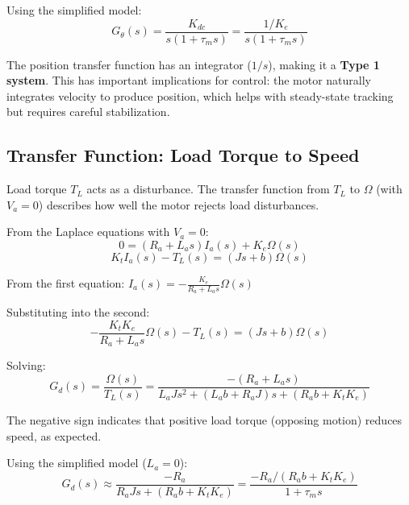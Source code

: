 Using the simplified model:
\begin{equation}
    \boxed{G_\theta(s) = \frac{K_{dc}}{s(1 + \tau_m s)} = \frac{1/K_e}{s(1 + \tau_m s)}}
    \label{eq:motor_tf_position_simplified}
\end{equation}

The position transfer function has an integrator ($1/s$), making it a \textbf{Type 1 system}. This has important implications for control: the motor naturally integrates velocity to produce position, which helps with steady-state tracking but requires careful stabilization.

\subsection{Transfer Function: Load Torque to Speed}

Load torque $T_L$ acts as a disturbance. The transfer function from $T_L$ to $\Omega$ (with $V_a = 0$) describes how well the motor rejects load disturbances.

From the Laplace equations with $V_a = 0$:
\begin{equation}
    0 = (R_a + L_a s) I_a(s) + K_e \Omega(s)
\end{equation}
\begin{equation}
    K_t I_a(s) - T_L(s) = (Js + b) \Omega(s)
\end{equation}

From the first equation: $I_a(s) = -\frac{K_e}{R_a + L_a s} \Omega(s)$

Substituting into the second:
\begin{equation}
    -\frac{K_t K_e}{R_a + L_a s} \Omega(s) - T_L(s) = (Js + b) \Omega(s)
\end{equation}

Solving:
\begin{equation}
    \boxed{G_d(s) = \frac{\Omega(s)}{T_L(s)} = \frac{-(R_a + L_a s)}{L_a J s^2 + (L_a b + R_a J) s + (R_a b + K_t K_e)}}
    \label{eq:motor_tf_disturbance}
\end{equation}

The negative sign indicates that positive load torque (opposing motion) reduces speed, as expected.

Using the simplified model ($L_a = 0$):
\begin{equation}
    G_d(s) \approx \frac{-R_a}{R_a J s + (R_a b + K_t K_e)} = \frac{-R_a/(R_a b + K_t K_e)}{1 + \tau_m s}
\end{equation}

